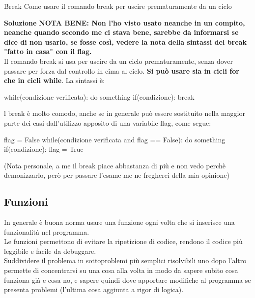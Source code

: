 \documentclass[10pt]{extarticle}
\makeatletter
\newcommand{\<}{\langle}
\renewcommand{\>}{\rangle}
\renewenvironment{proof}[1][\proofname] {\par\pushQED{\qed}
\renewcommand*{\proofname}{Soluzione}
{\normalfont\sffamily\bfseries\topsep6\p@\@plus6\p@\relax #1\@addpunct{.} }}{\popQED\endtrivlist\@endpefalse}
\theoremstyle{mystyle}{\newtheorem*{remark}{Nota}}
\theoremstyle{mystyle}{\newtheorem*{remarks}{Note}}
\theoremstyle{mystyle}{\newtheorem*{example}{Esempio}}
\theoremstyle{mystyle}{\newtheorem*{examples}{Esempi}}
\theoremstyle{definition}{\newtheorem*{exercise}{Exercise}}
\theoremstyle{warn}
\makeatother
\begin{document}
\begin{definition}{Break}{}
Come usare il comando break per uscire prematuramente da un ciclo
\end{definition}
\begin{proof}
\textbf{NOTA BENE: Non l'ho visto usato neanche in un compito, neanche quando secondo me ci stava bene, sarebbe da informarsi se dice di non usarlo, se fosse così, vedere la nota della sintassi del break "fatto in casa" con il flag.}\\
Il comando break si usa per uscire da un ciclo prematuramente, senza dover passare per forza dal controllo in cima al ciclo. \textbf{Si può usare sia in cicli for che in cicli while}. La sintassi è:
\begin{python}
while(condizione verificata):
    do something
    if(condizione):
        break
\end{python}
\end{proof}
\begin{remark}
l break è molto comodo, anche se in generale può essere sostituito nella maggior parte dei casi dall'utilizzo apposito di una variabile flag, come segue:
\begin{python}
flag = False
while(condizione verificata and flag == False):
    do something
    if(condizione):
        flag = True
\end{python}
    (Nota personale, a me il break piace abbastanza di più e non vedo perchè demonizzarlo, però per passare l'esame me ne fregherei della mia opinione)
\end{remark}

\newpage
\subsection{Funzioni}
In generale è buona norma usare una funzione ogni volta che si inserisce una funzionalità nel programma.\\
Le funzioni permettono di evitare la ripetizione di codice, rendono il codice più leggibile e facile da debuggare.\\
Suddividere il problema in sottoproblemi più semplici risolvibili uno dopo l'altro permette di concentrarsi su una cosa alla volta in modo da sapere subito cosa funziona già e cosa no, e sapere quindi dove apportare modifiche al programma se presenta problemi (l'ultima cosa aggiunta a rigor di logica).
\end{document}
